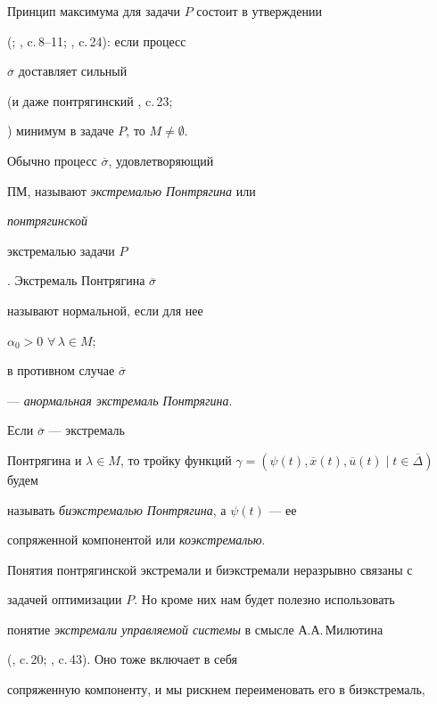 Принцип максимума для задачи $P$ состоит в утверждении


(\cite{1}; \cite{12}, c.\,8--11; \cite{13}, c.\,24): если процесс


$\overline{\sigma}$ доставляет сильный


(и даже понтрягинский \cite{13}, c.\,23;


\cite{16}) минимум в задаче $P$, то $M\neq\emptyset $.





Обычно процесс $\overline{\sigma}$, удовлетворяющий


ПМ, называют {\em экстремалью Понтрягина} или {\em понтрягинской


экстремалью задачи $P$}. Экстремаль Понтрягина $\overline{\sigma}$


называют нормальной, если для нее


$\alpha_0>0$\; $\forall\, \lambda\in M$;


в противном случае $\overline{\sigma}$


--- {\em анормальная экстремаль Понтрягина}.








\begin{defn}


Если $\overline{\sigma}$ --- экстремаль


Понтрягина и $\lambda\in M$, то тройку функций $\gamma =(\psi (t),


\overline{x}(t), \overline{u}(t)\mid t\in\overline{\Delta})$ будем


называть {\em биэкстремалью Понтрягина}, а $\psi (t)$ --- ее


сопряженной компонентой или {\em коэкстремалью}.


\end{defn}





Понятия понтрягинской экстремали и биэкстремали неразрывно связаны с


задачей оптимизации $P$. Но кроме них нам будет полезно использовать


понятие {\em экстремали управляемой системы} в смысле А.А.\,Милютина


(\cite{12}, c.\,20; \cite{13}, c.\,43). Оно тоже включает в себя


сопряженную компоненту, и мы рискнем переименовать его в биэкстремаль,


